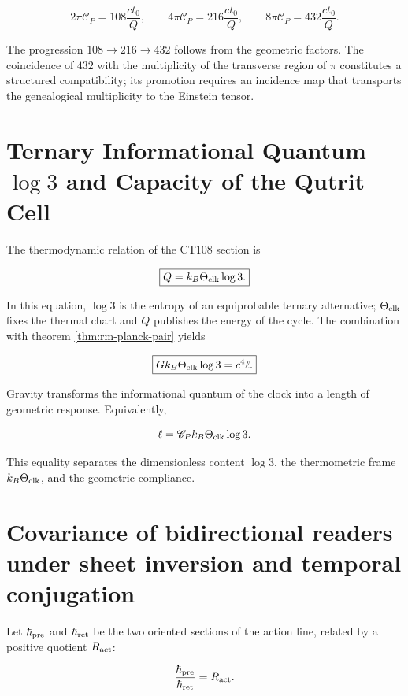 \[
2\pi\mathscr C_P=108\frac{ct_0}{Q},
\qquad
4\pi\mathscr C_P=216\frac{ct_0}{Q},
\qquad
8\pi\mathscr C_P=432\frac{ct_0}{Q}.
\]

The progression \(108\to216\to432\) follows from the geometric factors.
The coincidence of \(432\) with the multiplicity of the transverse region
of \(\pi\) constitutes a structured compatibility; its promotion requires
an incidence map that transports the genealogical multiplicity to the Einstein
tensor.

\section{Ternary Informational Quantum \(\log 3\) and Capacity of the Qutrit Cell}

The thermodynamic relation of the CT108 section is

\begin{equation}
\boxed{Q=k_B\Theta_{\rm clk}\log3.}
\label{eq:rm-planck-trit}
\end{equation}

In this equation, \(\log3\) is the entropy of an equiprobable ternary
alternative; \(\Theta_{\rm clk}\) fixes the thermal chart and \(Q\) publishes the
energy of the cycle. The combination with theorem
\ref{thm:rm-planck-pair} yields

\begin{equation}
\boxed{
Gk_B\Theta_{\rm clk}\log3=c^4\ell.}
\label{eq:rm-gravity-information}
\end{equation}

Gravity transforms the informational quantum of the clock into a length of
geometric response. Equivalently,

\[
\ell=\mathscr C_P k_B\Theta_{\rm clk}\log3.
\]

This equality separates the dimensionless content \(\log3\), the
thermometric frame \(k_B\Theta_{\rm clk}\), and the geometric compliance.

\section{Covariance of bidirectional readers under sheet inversion and temporal conjugation}

Let \(\hbar_{\rm pre}\) and \(\hbar_{\rm ret}\) be the two oriented sections
of the action line, related by a positive quotient
\(R_{\rm act}\):

\[
\frac{\hbar_{\rm pre}}{\hbar_{\rm ret}}=R_{\rm act}.
\]

